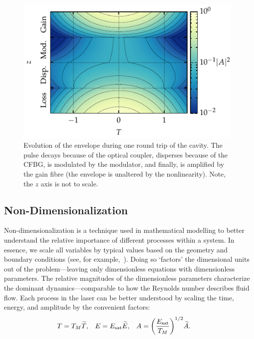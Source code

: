 \documentclass[9pt,twocolumn,twoside]{osajnl}
\let\originalleft\left
\let\originalright\right
\renewcommand{\left}{\mathopen{}\mathclose\bgroup\originalleft}
\renewcommand{\right}{\aftergroup\egroup\originalright}
\newcommand{\Es}{E_{\textrm{sat}}} %
\begin{document}
\begin{figure}[tbp]
	\centering
	\includegraphics{Figures/Evo}
	\caption{Evolution of the envelope during one round trip of the cavity. The pulse decays because of the optical coupler, disperses because of the CFBG, is modulated by the modulator, and finally, is amplified by the gain fibre (the envelope is unaltered by the nonlinearity). Note, the $z$ axis is not to scale.}
	\label{fig:cavityevo}
\end{figure}

\subsection{Non-Dimensionalization}
Non-dimensionalization is a technique used in mathematical modelling to better understand the relative importance of different processes within a system. In essence, we scale all variables by typical values based on the geometry and boundary conditions (see, for example,~\cite{howison2005}). Doing so `factors' the dimensional units out of the problem---leaving only dimensionless equations with dimensionless parameters. The relative magnitudes of the dimensionless parameters characterize the dominant dynamics---comparable to how the Reynolds number describes fluid flow. Each process in the laser can be better understood by scaling the time, energy, and amplitude by the convenient factors:
\begin{align}
	T &= T_M \widetilde{T},& E &= \Es \widetilde{E},& A &= \left( \frac{\Es}{T_M} \right)^{1/2} \widetilde{A}.
\end{align}
\end{document}
